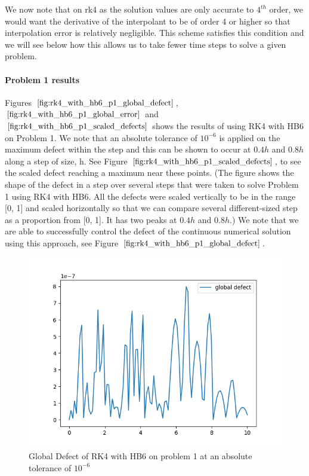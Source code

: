 \documentclass{article}
\begin{document}
We now note that on rk4 as the solution values are only accurate to $4^{th}$ order, we would want the derivative of the interpolant to be of order 4 or higher so that interpolation error is relatively negligible. This scheme satisfies this condition and we will see below how this allows us to take fewer time steps to solve a given problem.

\paragraph{Problem 1 results}
Figures $\ref{fig:rk4_with_hb6_p1_global_defect}$, $\ref{fig:rk4_with_hb6_p1_global_error}$ and $\ref{fig:rk4_with_hb6_p1_scaled_defects}$ shows the results of using RK4 with HB6 on Problem 1. We note that an absolute tolerance of $10^{-6}$ is applied on the maximum defect within the step and this can be shown to occur at $0.4h$ and $0.8h$ along a step of size, h. See Figure $\ref{fig:rk4_with_hb6_p1_scaled_defects}$, to see the scaled defect reaching a maximum near these points. (The figure shows the shape of the defect in a step over several steps that were taken to solve Problem 1 using RK4 with HB6. All the defects were scaled vertically to be in the range [0, 1] and scaled horizontally so that we can compare several different-sized step as a proportion from [0, 1]. It has two peaks at $0.4h$ and $0.8h$.) We note that we are able to successfully control the defect of the continuous numerical solution using this approach, see Figure $\ref{fig:rk4_with_hb6_p1_global_defect}$. 

\begin{figure}[H]
\centering
\includegraphics[width=0.7\linewidth]{./figures/rk4_with_hb6_p1_global_defect}
\caption{Global Defect of RK4 with HB6 on problem 1 at an absolute tolerance of $10^{-6}$}
\label{fig:rk4_with_hb6_p1_global_defect}
\end{figure}
\end{document}
